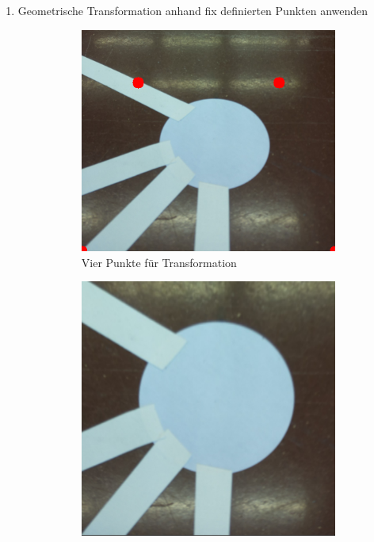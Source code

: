 \begin{enumerate}
        
    \item Geometrische Transformation anhand fix definierten Punkten anwenden
        \begin{figure}[H]
        \centering
        \begin{subfigure}{0.4\textwidth}
        \includegraphics[width=0.95\linewidth]{assets/informatik-prototyp/opencv/angle_detection/node_before_transformation_corners.png} 
        \caption{Vier Punkte für Transformation}
        \label{fig:node-before-geometric-transform}
        \end{subfigure}
        \begin{subfigure}{0.4\textwidth}
        \includegraphics[width=0.95\linewidth]{assets/informatik-prototyp/opencv/angle_detection/node_after_transformation.png} 

\end{subfigure}
\end{figure}
\end{enumerate}
